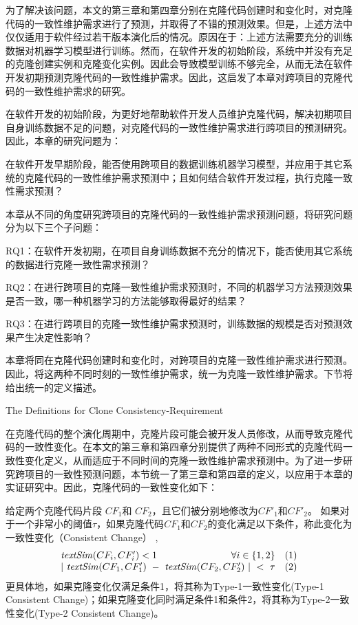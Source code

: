 为了解决该问题，本文的第三章和第四章分别在克隆代码创建时和变化时，对克隆代码的一致性维护需求进行了预测，并取得了不错的预测效果。但是，上述方法中仅仅适用于软件经过若干版本演化后的情况。原因在于：上述方法需要充分的训练数据对机器学习模型进行训练。然而，在软件开发的初始阶段，系统中并没有充足的克隆创建实例和克隆变化实例。因此会导致模型训练不够完全，从而无法在软件开发初期预测克隆代码的一致性维护需求。因此，这启发了本章对跨项目的克隆代码的一致性维护需求的研究。

在软件开发的初始阶段，为更好地帮助软件开发人员维护克隆代码，解决初期项目自身训练数据不足的问题，对克隆代码的一致性维护需求进行跨项目的预测研究。
因此，本章的研究问题为： 

在软件开发早期阶段，能否使用跨项目的数据训练机器学习模型，并应用于其它系统的克隆代码的一致性维护需求预测中；且如何结合软件开发过程，执行克隆一致性需求预测？

本章从不同的角度研究跨项目的克隆代码的一致性维护需求预测问题，将研究问题分为以下三个子问题：

RQ1：在软件开发初期，在项目自身训练数据不充分的情况下，能否使用其它系统的数据进行克隆一致性需求预测？

 RQ2：在进行跨项目的克隆一致性维护需求预测时，不同的机器学习方法预测效果是否一致，哪一种机器学习的方法能够取得最好的结果？

RQ3：在进行跨项目的克隆一致性维护需求预测时，训练数据的规模是否对预测效果产生决定性影响？

本章将同在克隆代码创建时和变化时，对跨项目的克隆一致性维护需求进行预测。因此，将这两种不同时刻的一致性维护需求，统一为克隆一致性维护需求。下节将给出统一的定义描述。

{The Definitions for Clone Consistency-Requirement}

在克隆代码的整个演化周期中，克隆片段可能会被开发人员修改，从而导致克隆代码的一致性变化。在本文的第三章和第四章分别提供了两种不同形式的克隆代码一致性变化定义，从而适应于不同时间的克隆一致性维护需求预测中。为了进一步研究跨项目的一致性预测问题，本节统一了第三章和第四章的定义，以应用于本章的实证研究中。因此，克隆代码的一致性变化如下：\\

\begin{definition}[一致性变化]  
\label{def-change}
给定两个克隆代码片段 $CF_1$和 $CF_2$，且它们被分别地修改为$CF'_1$和$CF'_2$。 如果对于一个非常小的阈值$\tau$，如果克隆代码$CF_1$和$CF_2$的变化满足以下条件，称此变化为一致性变化（Consistent Change） , 
\[
\begin{array}[t]{crl}
 \mathit{textSim}(CF_i, CF'_i) < 1 & \forall i \in \{1,2\} &(1) \\
 \multicolumn{2}{c}{| ~\mathit{textSim}(CF_1,CF'_1)  ~-~ \mathit{textSim}(CF_2,CF'_2) ~| ~< ~ \tau}  & (2)
\end{array}
\]
更具体地，如果克隆变化仅满足条件1，将其称为Type-1一致性变化(Type-1 Consistent Change)；如果克隆变化同时满足条件1和条件2，将其称为Type-2一致性变化(Type-2 Consistent Change)。
\end{definition}

